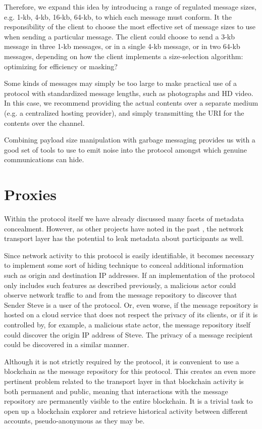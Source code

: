 Therefore, we expand this idea by introducing a range of regulated message sizes, e.g. 1-kb, 4-kb, 16-kb, 64-kb, to which each message must conform. It the responsibility of the client to choose the most effective set of message sizes to use when sending a particular message. The client could choose to send a 3-kb message in three 1-kb messages, or in a single 4-kb message, or in two 64-kb messages, depending on how the client implements a size-selection algorithm: optimizing for efficiency or masking?

Some kinds of messages may simply be too large to make practical use of a protocol with standardized message lengths, such as photographs and HD video. In this case, we recommend providing the actual contents over a separate medium (e.g. a centralized hosting provider), and simply transmitting the URI for the contents over the channel.

Combining payload size manipulation with garbage messaging provides us with a good set of tools to use to emit noise into the protocol amongst which genuine communications can hide.

\section{Proxies }\label{proxies}

Within the protocol itself we have already discussed many facets of metadata concealment. However, as other projects have noted in the past \parencite{erciccione_blog_2020, dingledine_tor_2004}, the network transport layer has the potential to leak metadata about participants as well.

Since network activity to this protocol is easily identifiable, it becomes necessary to implement some sort of hiding technique to conceal additional information such as origin and destination IP addresses. If an implementation of the protocol only includes such features as described previously, a malicious actor could observe network traffic to and from the message repository to discover that Sender Steve is a user of the protocol. Or, even worse, if the message repository is hosted on a cloud service that does not respect the privacy of its clients, or if it is controlled by, for example, a malicious state actor, the message repository itself could discover the origin IP address of Steve. The privacy of a message recipient could be discovered in a similar manner.

Although it is not strictly required by the protocol, it is convenient to use a blockchain as the message repository for this protocol. This creates an even more pertinent problem related to the transport layer in that blockchain activity is both permanent and public, meaning that interactions with the message repository are permanently visible to the entire blockchain. It is a trivial task to open up a blockchain explorer and retrieve historical activity between different accounts, pseudo-anonymous as they may be.

